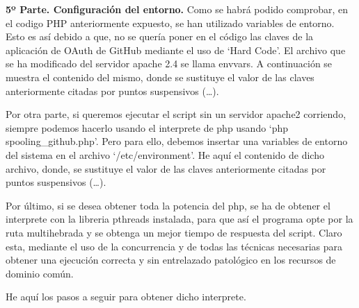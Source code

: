 \documentclass{article}
\begin{document}
\textbf{5º Parte. Configuración del entorno.}
Como se habrá podido comprobar, en el codigo PHP anteriormente expuesto, se
han utilizado variables de entorno. Esto es así debido a que, no se quería
poner en el código las claves de la aplicación de OAuth de GitHub mediante el
uso de `Hard Code'. El archivo que se ha modificado del servidor apache 2.4
se llama envvars. A continuación se muestra el contenido del mismo, donde
se sustituye el valor de las claves anteriormente citadas por puntos suspensivos
(\ldots).



Por otra parte, si queremos ejecutar el script sin un servidor apache2 corriendo, siempre podemos hacerlo
usando el interprete de php usando `php spooling\_github.php'. Pero para ello, debemos insertar
una variables de entorno del sistema en el archivo `/etc/environment'. He aquí el contenido de dicho
archivo, donde, se sustituye el valor de las claves anteriormente citadas por puntos suspensivos
(\ldots).



Por último, si se desea obtener toda la potencia del php, se ha de obtener el interprete
con la libreria pthreads instalada, para que así el programa opte por la ruta multihebrada
y se obtenga un mejor tiempo de respuesta del script. Claro esta, mediante el uso de la
concurrencia y de todas las técnicas necesarias para obtener una ejecución correcta y
sin entrelazado patológico en los recursos de dominio común.

He aquí los pasos a seguir para obtener dicho interprete.
\end{document}
